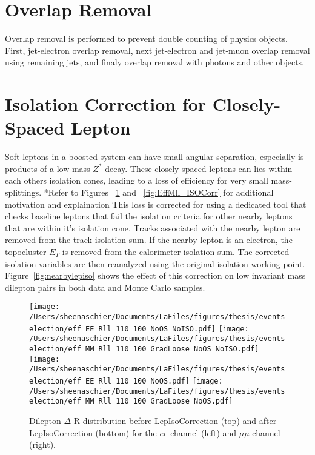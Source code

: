 \section{Overlap Removal}
Overlap removal is performed to prevent double counting of physics objects. First, jet-electron overlap removal, next jet-electron and jet-muon overlap removal using remaining jets, and finaly overlap removal with photons and other objects.

\section{Isolation Correction for Closely-Spaced Lepton}
 Soft leptons in a boosted system can have small angular separation, especially is products of a low-mass $Z^*$ decay.  These closely-spaced leptons can lies within each others isolation cones, leading to a loss of efficiency for very small mass-splittings.  *Refer to Figures~ \ref{fig:EffRll_ISOCorr} and ~\ref{fig:EffMll_ISOCorr} for additional motivation and explaination  This loss is corrected for using a dedicated tool that checks baseline leptons that fail the isolation criteria for other nearby leptons that are within it's isolation cone.  Tracks associated with the nearby lepton are removed from the track isolation sum.  If the nearby lepton is an electron, the topocluster $E_T$ is removed from the calorimeter isolation sum.  The corrected isolation variables are then reanalyzed using the original isolation working point.  Figure~\ref{fig:nearbylepiso} shows the effect of this correction on low invariant mass dilepton pairs in both data and Monte Carlo samples.


  \begin{figure}[tbp]
     \texttt{[image: /Users/sheenaschier/Documents/LaFiles/figures/thesis/eventselection/eff\_EE\_Rll\_110\_100\_NoOS\_NoISO.pdf]}
       \texttt{[image: /Users/sheenaschier/Documents/LaFiles/figures/thesis/eventselection/eff\_MM\_Rll\_110\_100\_GradLoose\_NoOS\_NoISO.pdf]}\\
     \texttt{[image: /Users/sheenaschier/Documents/LaFiles/figures/thesis/eventselection/eff\_EE\_Rll\_110\_100\_NoOS.pdf]}
     \texttt{[image: /Users/sheenaschier/Documents/LaFiles/figures/thesis/eventselection/eff\_MM\_Rll\_110\_100\_GradLoose\_NoOS.pdf]}\\
   \caption{Dilepton $\Delta$ R distribution before LepIsoCorrection (top) and after LepIsoCorrection (bottom) for the $ee$-channel (left) and $\mu\mu$-channel (right).}
   \label{fig:EffRll_ISOCorr}
 \end{figure}

